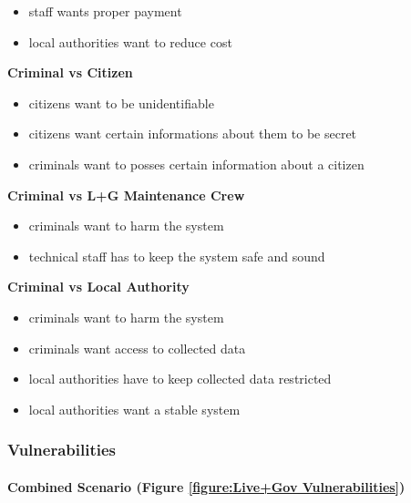 \begin{itemize}

\item
  staff wants proper payment
\item
  local authorities want to reduce cost
\end{itemize}

\textbf{Criminal vs Citizen}

\begin{itemize}

\item
  citizens want to be unidentifiable
\item
  citizens want certain informations about them to be secret
\item
  criminals want to posses certain information about a citizen
\end{itemize}

\textbf{Criminal vs L+G Maintenance Crew}

\begin{itemize}

\item
  criminals want to harm the system
\item
  technical staff has to keep the system safe and sound
\end{itemize}

\textbf{Criminal vs Local Authority}

\begin{itemize}

\item
  criminals want to harm the system
\item
  criminals want access to collected data
\item
  local authorities have to keep collected data restricted
\item
  local authorities want a stable system
\end{itemize}

\subsubsection{Vulnerabilities}



\paragraph{Combined Scenario (Figure \ref{figure:Live+Gov Vulnerabilities})}

